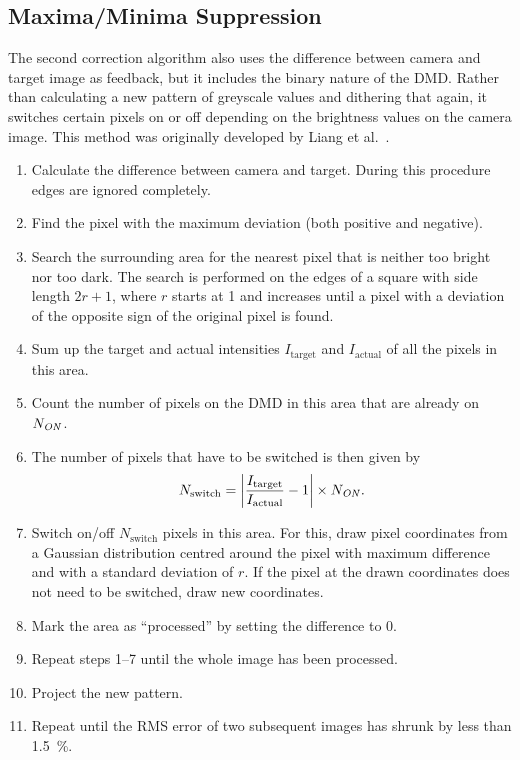 \subsection{Maxima/Minima Suppression}
The second correction algorithm also uses the difference between camera and target image as feedback, but it includes the binary nature of the DMD. Rather than calculating a new pattern of greyscale values and dithering that again, it switches certain pixels on or off depending on the brightness values on the camera image. This method was originally developed by Liang et al.\ \cite{liang:2010}.
\begin{enumerate}
    \item Calculate the difference between camera and target. During this procedure edges are ignored completely.
    \item Find the pixel with the maximum deviation (both positive and negative).
    \item Search the surrounding area for the nearest pixel that is neither too bright nor too dark. The search is performed on the edges of a square with side length $2r+1$, where $r$ starts at 1 and increases until a pixel with a deviation of the opposite sign of the original pixel is found.
    \item Sum up the target and actual intensities $I_\text{target}$ and $I_\text{actual}$ of all the pixels in this area.
    \item Count the number of pixels on the DMD in this area that are already on $N_\text{\textit{ON}}$.
    \item The number of pixels that have to be switched is then given by \[N_\text{switch} = \left| \frac{I_\text{target}}{I_\text{actual}} - 1 \right|\times N_\text{\textit{ON}}. \]
    \item Switch on/off $N_\text{switch}$ pixels in this area. For this, draw pixel coordinates from a Gaussian distribution centred around the pixel with maximum difference and with a standard deviation of $r$. If the pixel at the drawn coordinates does not need to be switched, draw new coordinates.
    \item Mark the area as \enquote{processed} by setting the difference to 0.
    \item Repeat steps 1--7 until the whole image has been processed.
    \item Project the new pattern.
    \item Repeat until the RMS error of two subsequent images has shrunk by less than \SI{1.5}{\percent}.
\end{enumerate}
